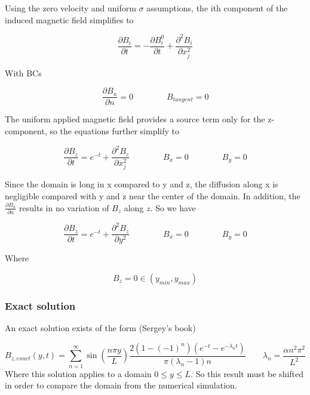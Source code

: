 \documentclass[11pt]{article}
\begin{document}
Using the zero velocity and uniform $\sigma$ assumptions, the ith component of the induced magnetic field simplifies to

\begin{equation}
	\frac{\partial B_i}{\partial t} 
	=
	-
	\frac{\partial B_i^0}{\partial t}
	+
	\frac{\partial^2 B_i}{\partial x_j^2} 
\end{equation}

With BCs

\begin{equation}
	\frac{\partial B_{n}}{\partial n} = 0
	\qquad \qquad
	B_{tangent} = 0
\end{equation}

The uniform applied magnetic field provides a source term only for the z-component, so the equations further simplify to

\begin{equation}
	\frac{\partial B_z}{\partial t} 
	=
	e^{-t}
	+
	\frac{\partial^2 B_z}{\partial x_j^2} 
	\qquad \qquad
	B_x = 0
	\qquad \qquad
	B_y = 0
\end{equation}

Since the domain is long in x compared to y and z, the diffusion along x is negligible compared with y and z near the center of the domain. In addition, the $\frac{\partial B_n}{\partial n}$ results in no variation of $B_z$ along $z$. So we have

\begin{equation}
	\frac{\partial B_z}{\partial t} 
	=
	e^{-t}
	+
	\frac{\partial^2 B_z}{\partial y^2} 
	\qquad \qquad
	B_x = 0
	\qquad \qquad
	B_y = 0
\end{equation}

Where

\begin{equation}
	B_z = 0
	\in (y_{min}, y_{max})
\end{equation}

\subsubsection{Exact solution}

An exact solution exists of the form (Sergey's book)

\begin{equation}
	\boxed{
	B_{z,exact}(y,t) 
	=
	\sum_{n=1}^{\infty}
	\sin \left( \frac{n\pi y}{L} \right)
	\frac{2 (1 - (-1)^n) (e^{-t}-e^{-\lambda_n t})}{\pi (\lambda_n-1)n}
	}
	\qquad
	\boxed{
	\lambda_n = \frac{\alpha n^2\pi^2}{L^2}
	}
\end{equation}
Where this solution applies to a domain $0 \le y \le L$. So this result must be shifted in order to compare the domain from the numerical simulation.
\end{document}
